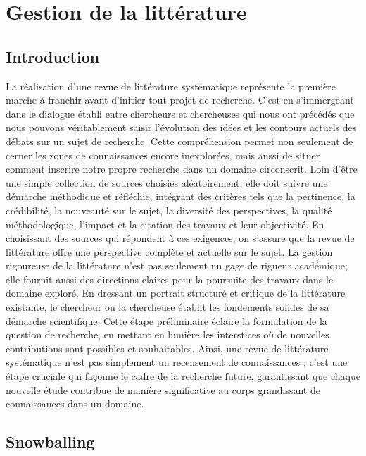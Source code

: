\documentclass[
  letterpaper,
]{scrbook}
\begin{document}

\hypertarget{sec-chap4}{%
\chapter{Gestion de la littérature}\label{sec-chap4}}

\hypertarget{introduction-1}{%
\section{Introduction}\label{introduction-1}}

La réalisation d'une revue de littérature systématique représente la
première marche à franchir avant d'initier tout projet de recherche.
C'est en s'immergeant dans le dialogue établi entre chercheurs et
chercheuses qui nous ont précédés que nous pouvons véritablement saisir
l'évolution des idées et les contours actuels des débats sur un sujet de
recherche. Cette compréhension permet non seulement de cerner les zones
de connaissances encore inexplorées, mais aussi de situer comment
inscrire notre propre recherche dans un domaine circonscrit. Loin d'être
une simple collection de sources choisies aléatoirement, elle doit
suivre une démarche méthodique et réfléchie, intégrant des critères tels
que la pertinence, la crédibilité, la nouveauté sur le sujet, la
diversité des perspectives, la qualité méthodologique, l'impact et la
citation des travaux et leur objectivité. En choisissant des sources qui
répondent à ces exigences, on s'assure que la revue de littérature offre
une perspective complète et actuelle sur le sujet. La gestion rigoureuse
de la littérature n'est pas seulement un gage de rigueur académique;
elle fournit aussi des directions claires pour la poursuite des travaux
dans le domaine exploré. En dressant un portrait structuré et critique
de la littérature existante, le chercheur ou la chercheuse établit les
fondements solides de sa démarche scientifique. Cette étape préliminaire
éclaire la formulation de la question de recherche, en mettant en
lumière les interstices où de nouvelles contributions sont possibles et
souhaitables. Ainsi, une revue de littérature systématique n'est pas
simplement un recensement de connaissances ; c'est une étape cruciale
qui façonne le cadre de la recherche future, garantissant que chaque
nouvelle étude contribue de manière significative au corps grandissant
de connaissances dans un domaine.

\hypertarget{snowballing}{%
\section{Snowballing}\label{snowballing}}
\end{document}
